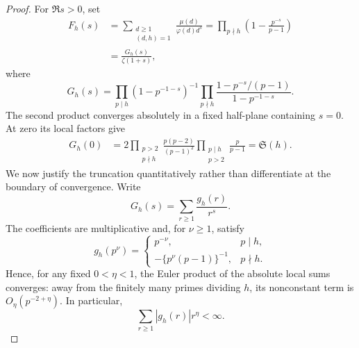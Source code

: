 \begin{proof}
For $\Re s>0$, set
\begin{align}
 F_h(s)
 &=\sum_{\substack{d\geq1\\(d,h)=1}}
   \frac{\mu(d)}{\varphi(d)d^s}
 =\prod_{p\nmid h}\left(1-\frac{p^{-s}}{p-1}\right)
 \label{eq:singular-dirichlet-series}\\
 &=\frac{G_h(s)}{\zeta(1+s)},
 \label{eq:singular-zeta-factorization}
\end{align}
where
\begin{equation}\label{eq:singular-G-product}
 G_h(s)=
 \prod_{p\mid h}(1-p^{-1-s})^{-1}
 \prod_{p\nmid h}
 \frac{1-p^{-s}/(p-1)}{1-p^{-1-s}}.
\end{equation}
The second product converges absolutely in a fixed half-plane containing
$s=0$.  At zero its local factors give
\begin{align*}
 G_h(0)
 &=2\prod_{\substack{p>2\\p\nmid h}}
      \frac{p(p-2)}{(p-1)^2}
    \prod_{\substack{p\mid h\\p>2}}\frac{p}{p-1}
 =\mathfrak S(h).
\end{align*}
We now justify the truncation quantitatively rather than differentiate at the
boundary of convergence.  Write
\[
 G_h(s)=\sum_{r\geq1}\frac{g_h(r)}{r^s}.
\]
The coefficients are multiplicative and, for $\nu\geq1$, satisfy
\[
 g_h(p^\nu)=
 \begin{cases}
  p^{-\nu},&p\mid h,\\
  -\{p^\nu(p-1)\}^{-1},&p\nmid h.
 \end{cases}
\]
Hence, for any fixed $0<\eta<1$, the Euler product of the absolute local
sums converges: away from the finitely many primes dividing $h$, its
nonconstant term is $O_\eta(p^{-2+\eta})$.  In particular,
\begin{equation}\label{eq:G-coefficient-moment}
 \sum_{r\geq1}|g_h(r)|r^\eta<\infty.
\end{equation}


\end{proof}
